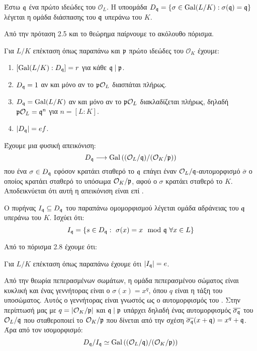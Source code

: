 \documentclass{report}
\begin{document}
\begin{defn}
	Έστω $\mathfrak{q}$ ένα πρώτο ιδεώδες του $\mathcal{O}_L$. Η υποομάδα $D_{\mathfrak{q}} = \{\sigma \in \operatorname{Gal} (L/K): \sigma(\mathfrak{q}) = \mathfrak{q}\}$ λέγεται η ομάδα διάσπασης του $\mathfrak{q}$ υπεράνω του $K$.
\end{defn}

Από την πρόταση 2.5 και το θεώρημα  παίρνουμε το ακόλουθο πόρισμα.

\begin{cor}
	Για $L/K$ επέκταση όπως παραπάνω και $\mathfrak{p}$ πρώτο ιδεώδες του $\mathcal{O}_K$ έχουμε:
	\begin{enumerate}
		\item $[\operatorname{Gal}(L/K) : D_{\mathfrak{q}}] = r$ για κάθε $\mathfrak{q} \mid \mathfrak{p}$.
		\item $D_{\mathfrak{q}} = 1$ αν και μόνο αν το $\mathfrak{p} \mathcal{O}_L$ διασπάται πλήρως.
		\item $D_{\mathfrak{q}} = \operatorname{Gal}(L/K)$ αν και μόνο αν το $\mathfrak{p} \mathcal{O}_L$ διακλαδίζεται πλήρως, δηλαδή $\mathfrak{p} \mathcal{O}_L = \mathfrak{q}^{n}$ για $n=[L:K]$.
		\item $|D_{\mathfrak{q}}| = ef$. 
	\end{enumerate}
\end{cor}

Έχουμε μια φυσική απεικόνιση:
$$D_{\mathfrak{q}} \longrightarrow \operatorname{Gal} \left( (\mathcal{O}_L/\mathfrak{q}) / (\mathcal{O}_K/\mathfrak{p})\right)$$ που ένα $\sigma \in D_{\mathfrak{q}}$ εφόσον κρατάει σταθερό το $\mathfrak{q}$ επάγει έναν $\mathcal{O}_L/\mathfrak{q}$-αυτομορφισμό $\overline{\sigma}$ ο οποίος κρατάει σταθερό το υπόσωμα $\mathcal{O}_K/\mathfrak{p}$, αφού ο $\sigma$ κρατάει σταθερό το $K$. Αποδεικνύεται ότι αυτή η απεικόνιση είναι επί . %

\begin{defn}
	Ο πυρήνας $I_{\mathfrak{q}} \subseteq D_{\mathfrak{q}}$ του παραπάνω ομομορφισμού λέγεται ομάδα αδράνειας του $\mathfrak{q}$ υπεράνω του $K$. Ισχύει ότι:
	$$I_{\q} = \{s \in D_{\q}: \ \sigma(x) = x \mod \q \ \forall x \in L\}$$
\end{defn}

Από το πόρισμα 2.8 έχουμε ότι:
\begin{cor}
	Για $L/K$ επέκταση όπως παραπάνω έχουμε ότι $|I_{\mathfrak{q}}| = e$.
\end{cor}


Από την θεωρία πεπερασμένων σωμάτων, η ομάδα  πεπερασμένου σώματος είναι κυκλική και ένας γεννήτορας είναι ο $\sigma(x) = x^q$, όπου $q$ είναι η τάξη του υποσώματος. Αυτός ο γεννήτορας είναι γνωστός ως ο αυτομορφισμός του . Στην περίπτωσή μας με $q = |\mathcal{O}_K/\mathfrak{p}|$ και $\mathfrak{q} \mid \mathfrak{p}$ υπάρχει δηλαδή ένας αυτομορφισμός $\overline{\sigma_{\mathfrak{q}}}$ του $\mathcal{O}_L/\mathfrak{q}$ που σταθεροποιεί το $\mathcal{O}_K/\mathfrak{p}$ που δίνεται από την σχέση $\overline{\sigma_{\mathfrak{q}}}(x + \mathfrak{q}) = x^q + \mathfrak{q}$. Άρα από τον ισομορφισμό:
$$D_{\mathfrak{q}}/ I_{\mathfrak{q}} \simeq \operatorname{Gal} \left( (\mathcal{O}_L/\mathfrak{q}) / (\mathcal{O}_K/\mathfrak{p}) \right)$$
\end{document}
